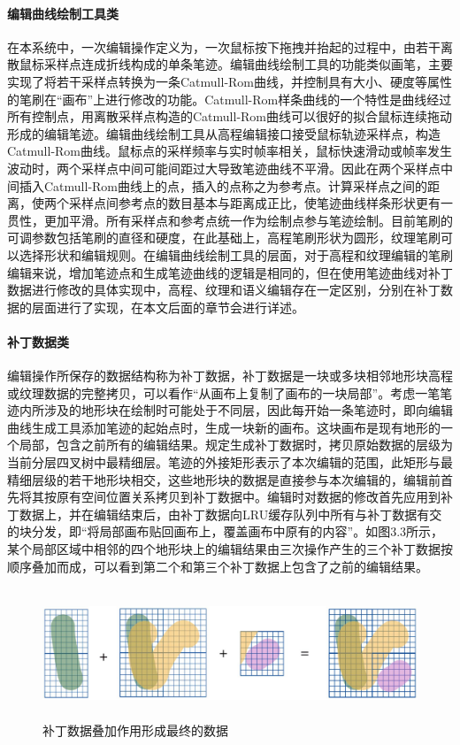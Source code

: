 \paragraph{编辑曲线绘制工具类}
在本系统中，一次编辑操作定义为，一次鼠标按下拖拽并抬起的过程中，由若干离散鼠标采样点连成折线构成的单条笔迹。编辑曲线绘制工具的功能类似画笔，主要实现了将若干采样点转换为一条Catmull-Rom曲线，并控制具有大小、硬度等属性的笔刷在“画布”上进行修改的功能。Catmull-Rom样条曲线的一个特性是曲线经过所有控制点\supercite{catmull-rom}，用离散采样点构造的Catmull-Rom曲线可以很好的拟合鼠标连续拖动形成的编辑笔迹。编辑曲线绘制工具从高程编辑接口接受鼠标轨迹采样点，构造Catmull-Rom曲线。鼠标点的采样频率与实时帧率相关，鼠标快速滑动或帧率发生波动时，两个采样点中间可能间距过大导致笔迹曲线不平滑。因此在两个采样点中间插入Catmull-Rom曲线上的点，插入的点称之为参考点。计算采样点之间的距离，使两个采样点间参考点的数目基本与距离成正比，使笔迹曲线样条形状更有一贯性，更加平滑。所有采样点和参考点统一作为绘制点参与笔迹绘制。目前笔刷的可调参数包括笔刷的直径和硬度，在此基础上，高程笔刷形状为圆形，纹理笔刷可以选择形状和编辑规则。在编辑曲线绘制工具的层面，对于高程和纹理编辑的笔刷编辑来说，增加笔迹点和生成笔迹曲线的逻辑是相同的，但在使用笔迹曲线对补丁数据进行修改的具体实现中，高程、纹理和语义编辑存在一定区别，分别在补丁数据的层面进行了实现，在本文后面的章节会进行详述。\par
\paragraph{补丁数据类}
编辑操作所保存的数据结构称为补丁数据，补丁数据是一块或多块相邻地形块高程或纹理数据的完整拷贝，可以看作“从画布上复制了画布的一块局部”。考虑一笔笔迹内所涉及的地形块在绘制时可能处于不同层，因此每开始一条笔迹时，即向编辑曲线生成工具添加笔迹的起始点时，生成一块新的画布。这块画布是现有地形的一个局部，包含之前所有的编辑结果。规定生成补丁数据时，拷贝原始数据的层级为当前分层四叉树中最精细层。笔迹的外接矩形表示了本次编辑的范围，此矩形与最精细层级的若干地形块相交，这些地形块的数据是直接参与本次编辑的，编辑前首先将其按原有空间位置关系拷贝到补丁数据中。编辑时对数据的修改首先应用到补丁数据上，并在编辑结束后，由补丁数据向LRU缓存队列中所有与补丁数据有交的块分发，即“将局部画布贴回画布上，覆盖画布中原有的内容”。如图3.3所示，某个局部区域中相邻的四个地形块上的编辑结果由三次操作产生的三个补丁数据按顺序叠加而成，可以看到第二个和第三个补丁数据上包含了之前的编辑结果。\par

\begin{figure}[htbp]
\centering
\includegraphics[height=3.9cm,width=14.8cm]{figures/mergeData.jpg}
\caption{补丁数据叠加作用形成最终的数据}
\end{figure}

